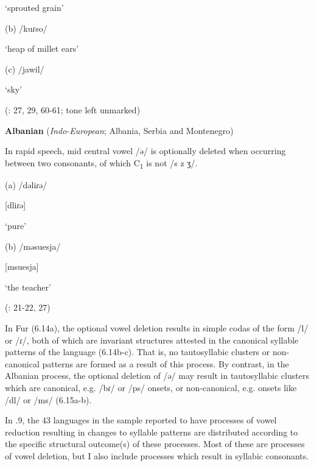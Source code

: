 ‘sprouted grain’

(b)  /kuɾso/

‘heap of millet ears’

(c)  /jawil/

‘sky’

(\citealt{Jakobi1990}: 27, 29, 60-61; tone left unmarked)

\z

\ea\label{ex:(6.15)}
   \textbf{Albanian} (\textit{Indo-European}; Albania, Serbia and Montenegro)

  In rapid speech, mid central vowel /ə/ is optionally deleted when occurring between two consonants, of which C\textsubscript{1} is not /s z ʒ/.

(a)  /dəliɾə/

[dliɾə]

‘pure’

(b)  /məsuesja/

[msuesja]

‘the teacher’

(\citealt{Klippenstein2010}: 21-22, 27)

\z

  In Fur (6.14a), the optional vowel deletion results in simple codas of the form /l/ or /ɾ/, both of which are invariant structures attested in the canonical syllable patterns of the language (6.14b-c). That is, no tautosyllabic clusters or non-canonical patterns are formed as a result of this process. By contrast, in the Albanian process, the optional deletion of /ə/ may result in tautosyllabic clusters which are canonical, e.g. /bɾ/ or /ps/ onsets, or non-canonical, e.g. onsets like /dl/ or /ms/ (6.15a-b).

  In .9, the 43 languages in the sample reported to have processes of vowel reduction resulting in changes to syllable patterns are distributed according to the specific structural outcome(s) of these processes. Most of these are processes of vowel deletion, but I also include processes which result in syllabic consonants.

